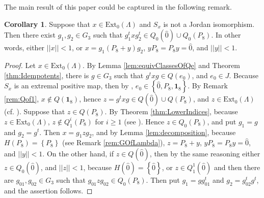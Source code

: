 \documentclass[12pt]{article}
\theoremstyle{plain}
\theoremstyle{definition}
\newtheorem{corollary}{Corollary}
\theoremstyle{remark}
\numberwithin{equation}{section}
\begin{document}
The main result of this paper could be captured in the following remark.
\begin{corollary}
\label{cor:q0}
    Suppose that $x \in \text{Ext}_{0}(\Lambda)$ and $S_{x}$ is not a Jordan isomorphism.
    Then there exist $g_{1}, g_{2} \in G_{3}$
    such that $g_{1}^{t} x g_{2}^{t} \in Q_{0}(\hat{0}) \cup Q_{0}(P_{8})$.
    In other words,
    either $||x|| < 1$,
    or
    $x = g_{1} (P_{8} + y) g_{2}$,  $y P_{8} = P_{8} y = \hat{0}$,
    and $|| y || < 1$.
\end{corollary}
\begin{proof}
Let $x \in  \text{Ext}_{0}(\Lambda)$.
    By Lemma \ref{lem:equivClassesOfQe} and Theorem \ref{thm:Idempotents}, there is $g \in G_{3}$ such that
    $g^{t} x g \in Q(e_{0})$, and $e_{0} \in J$.
    Because $S_{x}$ is an extremal positive map, then by
    \cite[Theorem 2]{miller2015stable},
    $e_{0} \in \left \{ \hat{0}, P_{8}, \mathbf{1}_{8} \right \}$.
    By Remark \ref{rem:Qof1}, $x \notin Q(\mathbf{1}_{8})$, hence
    $z = g^{t} x g \in Q(\hat{0}) \cup Q(P_{8})$,    
    and $z \in \text{Ext}_{0}(\Lambda)$
    (cf. \cite[Lemma 3.1.2]{stormer2013positive}).
    Suppose that $z \in Q(P_{8})$.
    By Theorem \ref{thm:LowerIndices},
    because $z \in \text{Ext}_{0}(\Lambda)$,
    $z \notin Q_{1}^{i}(P_{8})$
    for $i \geq 1$ (see  \cite[Theorem 2]{miller2015stable}).
    Hence $z \in Q_{0}(P_{8})$, and put $g_{1} = g$ and $g_{2} = g^{t}$.
    Then $x = g_{1} z g_{2}$,
    and by Lemma \ref{lem:decomposition}, because $H(P_{8}) = \left \{ P_{8} \right \}$
    (see Remark \ref{rem:GOfLambda}),
    $z = P_{8} + y$,  $y P_{8} = P_{8} y = \hat{0}$, and $||y|| < 1$.
    On the other hand, if $z \in Q(\hat{0})$,
    then by the same reasoning either $z \in Q_{0}(\hat{0})$,
    and $||z|| < 1$, because $H(\hat{0}) = \left \{ \hat{0} \right \}$, or
    $z \in Q_{1}^{1}(\hat{0})$ and then there are $g_{01}, g_{02} \in G_{3}$ such that
    $g_{01} z g_{02} \in Q_{0}(P_{8})$.
    Then put $g_{1} = g g_{01}^{t}$ and $g_{2} = g_{02}^{t} g^{t}$,
    and the assertion follows.
\end{proof}
\end{document}

